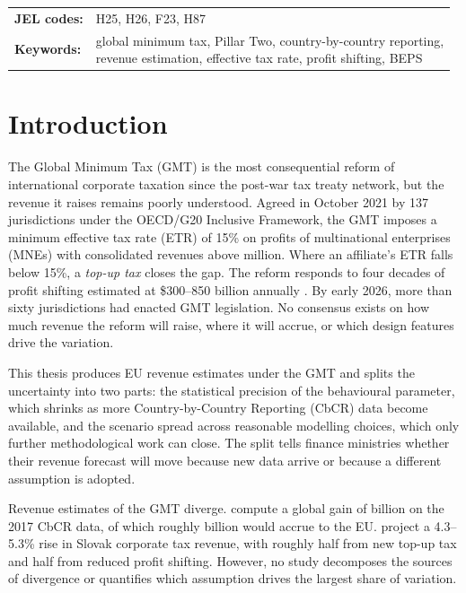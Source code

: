 \documentclass[11pt,a4paper]{article}
\newcommand{\EUR}{\texteuro}
\begin{document}
\begin{titlepage}
\begin{center}
    \vfill

    \begin{tabular}{@{}ll@{}}
      \textbf{JEL codes:} &
        H25, H26, F23, H87 \\[0.5em]
      \textbf{Keywords:} &
        \parbox[t]{0.75\textwidth}{global minimum tax, Pillar Two,
        country-by-country reporting,\\
        revenue estimation, effective tax rate, profit shifting, BEPS}
    \end{tabular}

  \end{center}
\end{titlepage}

\newpage
\thispagestyle{plain}
\setcounter{page}{1}

\section{Introduction}\label{sec:introduction}

The Global Minimum Tax (GMT) is the most consequential reform of international corporate taxation since the post-war tax treaty network, but the revenue it raises remains poorly understood. Agreed in October 2021 by 137 jurisdictions under the OECD/G20 Inclusive Framework, the GMT imposes a minimum effective tax rate (ETR) of 15\% on profits of multinational enterprises (MNEs) with consolidated revenues above \EUR750 million. Where an affiliate's ETR falls below 15\%, a \emph{top-up tax} closes the gap. The reform responds to four decades of profit shifting estimated at \$300--850 billion annually \citep{torslov2023,garcia-bernardo2024,blouin2023,cobham2018}. By early 2026, more than sixty jurisdictions had enacted GMT legislation. No consensus exists on how much revenue the reform will raise, where it will accrue, or which design features drive the variation.

This thesis produces EU revenue estimates under the GMT and splits the uncertainty into two parts: the statistical precision of the behavioural parameter, which shrinks as more Country-by-Country Reporting (CbCR) data become available, and the scenario spread across reasonable modelling choices, which only further methodological work can close. The split tells finance ministries whether their revenue forecast will move because new data arrive or because a different assumption is adopted.

Revenue estimates of the GMT diverge. \citet{barake2022} compute a global gain of \EUR179 billion on the 2017 CbCR data, of which roughly \EUR55 billion would accrue to the EU. \citet{boukal2026} project a 4.3--5.3\% rise in Slovak corporate tax revenue, with roughly half from new top-up tax and half from reduced profit shifting. However, no study decomposes the sources of divergence or quantifies which assumption drives the largest share of variation.
\end{document}
